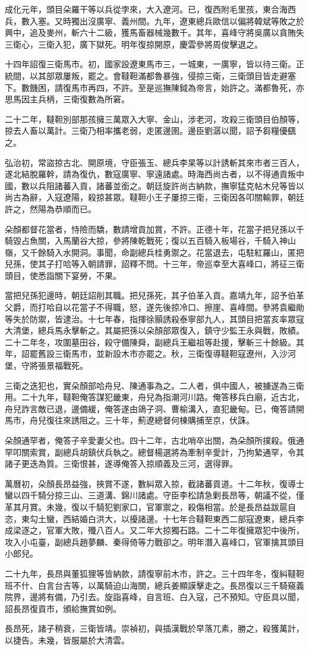 \begin{pinyinscope}
成化元年，頭目朵羅干等以兵從孛來，大入遼河。已，復西附毛里孩，東合海西兵，數入塞。又時獨出沒廣寧、義州間。九年，遼東總兵歐信以偏將韓斌等敗之於興中，追及麥州，斬六十二級，獲馬畜器械幾數千。其年，喜峰守將吳廣以貪賄失三衛心，三衛入犯，廣下獄死。明年復掠開原，慶雲參將周俊擊退之。

十四年詔復三衛馬市。初，國家設遼東馬市三，一城東，一廣寧，皆以待三衛。正統間，以其部眾屢叛，罷之。會韃靼滿都魯暴強，侵掠三衛，三衛頭目皆走避塞下。數饑困，請復馬市再四，不許。至是巡撫陳鉞為帝言，始許之。滿都魯死，亦思馬因主兵柄，三衛復數為所窘。

二十二年，韃靼別部那孩擁三萬眾入大寧、金山，涉老河，攻殺三衛頭目伯顏等，掠去人畜以萬計。三衛乃相率攜老弱，走匿邊圉。邊臣劉潺以聞，詔予芻糧優颻之。

弘治初，常盜掠古北、開原境，守臣張玉、總兵李杲等以計誘斬其來市者三百人，遂北結脫羅幹，請為復仇，數寇廣寧、寧遠諸處。時海西尚古者，以不得通貢叛中國，數以兵阻諸蕃入貢，諸蕃並銜之。朝廷旋許尚古納款，撫寧猛克帖木兒等皆以尚古為辭，入寇遼陽，殺掠甚眾。韃靼小王子屢掠三衛，三衛因各叩關輸罪，朝廷許之，然陽為恭順而已。

朵顏都督花當者，恃險而驕，數請增貢加賞，不許。正德十年，花當子把兒孫以千騎毀占魚關，入馬蘭谷大掠，參將陳乾戰死；復以五百騎入板場谷，千騎入神山嶺，又千餘騎入水開洞。事聞，命副總兵桂勇禦之。花當退去，屯駐紅羅山，匿把兒孫，使其子打哈等入朝請罪，詔釋不問。十三年，帝巡幸至大喜峰口，將征三衛頭目，使悉詣關下宴勞，不果。

當把兒孫犯邊時，朝廷詔削其職。把兒孫死，其子伯革入貢。嘉靖九年，詔予伯革父爵，而打哈自以花當子不得職，怒，遂先後掠冷口、擦崖、喜峰間。參將袁繼勛等失於防禦，皆逮治。十七年春，指揮徐顥誘殺泰寧部九人，其頭目把當亥率眾寇大清堡，總兵馬永擊斬之。其屬把孫以朵顏部眾復入，鎮守少監王永與戰，敗績。二十二年冬，攻圍墓田谷，殺守備陳舜，副總兵王繼祖等赴援，擊斬三十餘級。其年，詔罷舊設三衛馬市，並新設木市亦罷之。秋，三衛復導韃靼寇遼州，入沙河堡，守將張景福戰死。

三衛之迭犯也，實朵顏部哈舟兒、陳通事為之。二人者，俱中國人，被擄遂為三衛用。二十九年，韃靼俺答謀犯畿東，舟兒為指潮河川路。俺答移兵白廟，近古北，舟兒詐言敵已退，邊備緩，俺答遂由鴿子洞、曹榆溝入，直犯畿甸。已，俺答請開馬市，舟兒復往來誘阻之。三十年，薊遼總督何棟購捕至京，伏誅。

朵顏通罕者，俺答子辛愛妻父也。四十二年，古北哨卒出關，為朵顏所撲殺。俄通罕叩關索賞，副總兵胡鎮伏兵執之。總督楊選將為牽制辛愛計，乃拘縶通罕，令其諸子更迭為質。三衛恨甚，遂導俺答入掠順義及三河，選得罪。

萬曆初，朵顏長昂益強，挾賞不遂，數糾眾入掠，截諸蕃貢道。十二年秋，復導士蠻以四千騎分掠三山、三道溝、錦川諸處。守臣李松請急剿長昂等，朝議不從，僅革其月賞。未幾，復以千騎犯劉家口，官軍禦之，殺傷相當。於是長昂益跋扈自恣，東勾土蠻，西結婚白洪大，以擾諸邊。十七年合韃靼東西二部寇遼東，總兵李成梁逐之，官軍大敗，殲八百人。又二年大掠獨石路。二十二年復擁眾犯中後所，攻入小屯臺，副總兵趙夢麟、秦得倚等力戰卻之。明年潛入喜峰口，官軍擒其頭目小郎兒。

二十九年，長昂與董狐狸等皆納款，請復寧前木市，許之。三十四年冬，復糾韃靼班不什、白言台吉等，以萬騎迫山海關，總兵姜顯謨擊走之。長昂復以三千騎窺義院界，邊將有備，乃引去。旋詣喜峰，自言班、白入寇，己不預知。守臣具以聞，詔長昂復貢市，頒給撫賞如例。

長昂死，諸子稍衰，三衛皆靖。崇禎初，與插漢戰於早落兀素，勝之，殺獲萬計，以捷告。未幾，皆服屬於大清雲。


\end{pinyinscope}